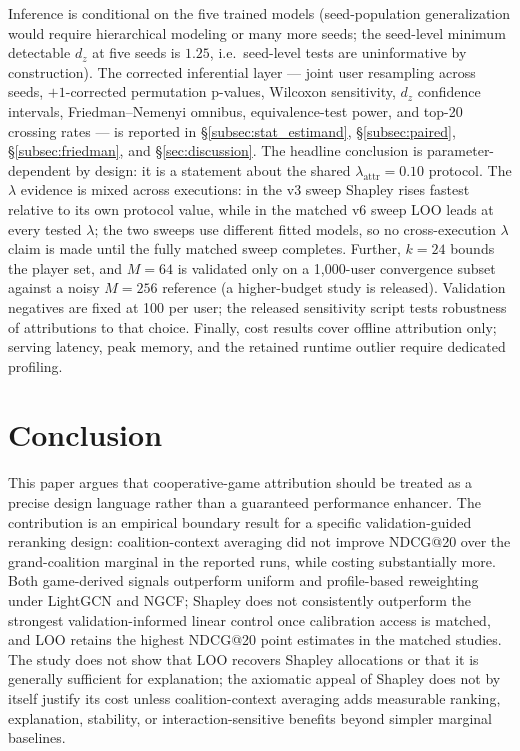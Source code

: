 \documentclass[pdflatex,sn-mathphys-num]{sn-jnl}
\begin{document}
Inference is conditional on the five trained models (seed-population generalization would require hierarchical modeling or many more seeds; the seed-level minimum detectable $d_z$ at five seeds is $1.25$, i.e.\ seed-level tests are uninformative by construction). The corrected inferential layer --- joint user resampling across seeds, $+1$-corrected permutation p-values, Wilcoxon sensitivity, $d_z$ confidence intervals, Friedman--Nemenyi omnibus, equivalence-test power, and top-20 crossing rates --- is reported in \S\ref{subsec:stat_estimand}, \S\ref{subsec:paired}, \S\ref{subsec:friedman}, and \S\ref{sec:discussion}. The headline conclusion is parameter-dependent by design: it is a statement about the shared $\lambda_{\mathrm{attr}}=0.10$ protocol. The $\lambda$ evidence is mixed across executions: in the v3 sweep Shapley rises fastest relative to its own protocol value, while in the matched v6 sweep LOO leads at every tested $\lambda$; the two sweeps use different fitted models, so no cross-execution $\lambda$ claim is made until the fully matched sweep completes. Further, $k=24$ bounds the player set, and $M=64$ is validated only on a 1,000-user convergence subset against a noisy $M=256$ reference (a higher-budget study is released). Validation negatives are fixed at 100 per user; the released sensitivity script tests robustness of attributions to that choice. Finally, cost results cover offline attribution only; serving latency, peak memory, and the retained runtime outlier require dedicated profiling.


\section{Conclusion}\label{sec:conclusion}

This paper argues that cooperative-game attribution should be treated as a precise design language rather than a guaranteed performance enhancer. The contribution is an empirical boundary result for a specific validation-guided reranking design: coalition-context averaging did not improve NDCG@20 over the grand-coalition marginal in the reported runs, while costing substantially more. Both game-derived signals outperform uniform and profile-based reweighting under LightGCN and NGCF; Shapley does not consistently outperform the strongest validation-informed linear control once calibration access is matched, and LOO retains the highest NDCG@20 point estimates in the matched studies. The study does not show that LOO recovers Shapley allocations or that it is generally sufficient for explanation; the axiomatic appeal of Shapley does not by itself justify its cost unless coalition-context averaging adds measurable ranking, explanation, stability, or interaction-sensitive benefits beyond simpler marginal baselines.
\end{document}
